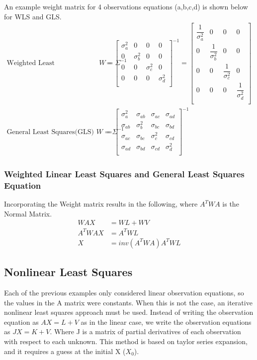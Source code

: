 An example weight matrix for 4 observations equations (a,b,c,d) is shown below for WLS and GLS.
\begin{align*}
\text{Weighted Least Squares(WLS) } W = \Sigma^{-1} &= 
\begin{bmatrix}
\sigma_{a}^2 & 0 & 0 & 0 \\ 
0 & \sigma_{b}^2 & 0 & 0 \\
0 & 0 & \sigma_{c}^2 & 0 \\
0 & 0 & 0 & \sigma_{d}^2 \\
\end{bmatrix}
^{-1}
=
\begin{bmatrix}
\dfrac{1}{\sigma_{a}^2} & 0 & 0 & 0 \\ 
0 & \dfrac{1}{\sigma_{b}^2} & 0 & 0 \\
0 & 0 & \dfrac{1}{\sigma_{c}^2} & 0 \\
0 & 0 & 0 & \dfrac{1}{\sigma_{d}^2} \\
\end{bmatrix}
\\
\text{General Least Squares(GLS) } W = \Sigma^{-1} &= 
\begin{bmatrix}
\sigma_{a}^2 & \sigma_{ab} & \sigma_{ac} & \sigma_{ad} \\ 
\sigma_{ab} & \sigma_{b}^2 & \sigma_{bc} & \sigma_{bd} \\ 
\sigma_{ac} & \sigma_{bc} & \sigma_{c}^2 & \sigma_{cd} \\ 
\sigma_{ad} & \sigma_{bd} & \sigma_{cd} & \sigma_{d}^2 \\ 
\end{bmatrix}
^{-1}
\end{align*}
\subsubsection*{Weighted Linear Least Squares and General Least Squares Equation}
Incorporating the Weight matrix results in the following, where $A^TWA$ is the Normal Matrix.
\begin{align*}
WAX &= WL + WV \\
A^TWAX &= A^TWL \\
X &= inv(A^TWA)A^TWL
\end{align*}

\subsection{Nonlinear Least Squares}
Each of the previous examples only considered linear observation equations, so the values in the A matrix were constants.  When this is not the case, an iterative nonlinear least squares approach must be used.  Instead of writing the observation equation as $AX=L+V$ as in the linear case, we write the observation equations as $JX=K+V$. Where J is a matrix of partial derivatives of each observation with respect to each unknown.  This method is based on taylor series expansion, and it requires a guess at the initial X ($X_0$).  

